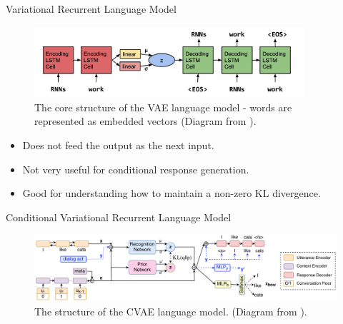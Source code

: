 \documentclass[aspectratio=169, 11pt]{beamer}
\begin{document}
\begin{frame}{Variational Recurrent Language Model}
  \begin{figure}[!ht]
    \centering
    \includegraphics[width=100mm]{diagrams/seq2seqvae.png}
    \caption{The core structure of the VAE language model - words are represented as embedded vectors (Diagram from \cite{bowman_generating_2015}). \label{vae_seq2seq}}
  \end{figure}

  \begin{itemize}
    \item Does not feed the output as the next input.
    \item Not very useful for conditional response generation.
    \item Good for understanding how to maintain a non-zero KL divergence.
  \end{itemize}
\end{frame}


\begin{frame}{Conditional Variational Recurrent Language Model}
  \begin{figure}[!ht]
    \centering
    \includegraphics[width=120mm]{diagrams/cvae_seq2seq.png}
    \caption{The structure of the CVAE language model. (Diagram from \cite{zhao_learning_2017}). \label{cvae_seq2seq}}
  \end{figure}
\end{frame}
\end{document}
